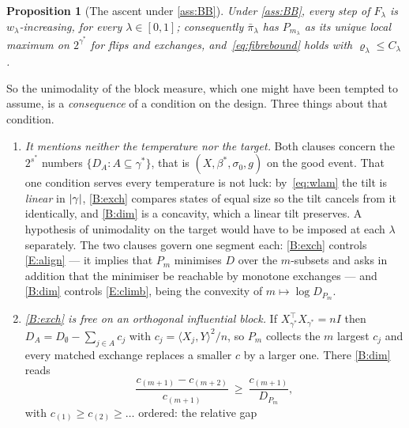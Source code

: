 \documentclass[aos]{imsart}
\DeclarePairedDelimiter{\abs}{\lvert}{\rvert}
\theoremstyle{plain}
\newtheorem{proposition}{Proposition}[section]
\theoremstyle{definition}
\begin{document}
    \begin{proposition}[The ascent under \cref{ass:BB}]
        \label{prop:dip}
        Under \cref{ass:BB}, every step of $F_\lambda$ is
        $w_\lambda$-increasing, for every $\lambda\in[0,1]$; consequently
        $\bar\pi_\lambda$ has $P_{m_\lambda}$ as its unique local maximum on
        $2^{\gamma^{\ast}}$ for flips and exchanges, and~\eqref{eq:fibrebound}
        holds with $\varrho_\lambda\leq C_\lambda$.
    \end{proposition}

    So the unimodality of the block measure, which one might have been
    tempted to assume, is a \emph{consequence} of a condition on the design.
    Three things about that condition.

    \begin{enumerate}[label=(\roman*),leftmargin=2.6em]
        \item \emph{It mentions neither the temperature nor the target.}
        Both clauses concern the $2^{s^{\ast}}$ numbers
        $\{D_A:A\subseteq\gamma^{\ast}\}$, that is $(X,\beta^{\ast},
        \sigma_0,g)$ on the good event. That one condition serves every
        temperature is not luck: by~\eqref{eq:wlam} the tilt is
        \emph{linear} in $\abs\gamma$, \ref{B:exch} compares states of equal
        size so the tilt cancels from it identically, and \ref{B:dim} is a
        concavity, which a linear tilt preserves. A hypothesis of
        unimodality on the target would have to be imposed at each
        $\lambda$ separately. The two clauses govern one segment each:
        \ref{B:exch} controls \ref{E:align} --- it implies that $P_m$
        minimises $D$ over the $m$-subsets and asks in addition that the
        minimiser be reachable by monotone exchanges --- and \ref{B:dim}
        controls \ref{E:climb}, being the convexity of
        $m\mapsto\log D_{P_m}$.
        \item \emph{\ref{B:exch} is free on an orthogonal influential
        block.} If $X_{\gamma^{\ast}}^{\top}X_{\gamma^{\ast}}=nI$ then
        $D_A=D_\emptyset-\sum_{j\in A}c_j$ with
        $c_j=\langle X_j,Y\rangle^{2}/n$, so $P_m$ collects the $m$ largest
        $c_j$ and every matched exchange replaces a smaller $c$ by a larger
        one. There \ref{B:dim} reads
        \begin{equation}
            \label{eq:orth}
            \frac{c_{(m+1)}-c_{(m+2)}}{c_{(m+1)}}
            \ \geq\ \frac{c_{(m+1)}}{D_{P_m}} ,
        \end{equation}
        with $c_{(1)}\geq c_{(2)}\geq\dots$ ordered: the relative gap

\end{enumerate}
\end{document}
